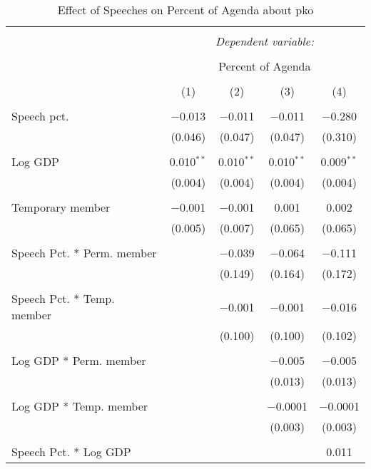 
\begin{table}[!htbp] \centering 
  \caption{Effect of Speeches on Percent of Agenda about  pko} 
  \label{} 
\begin{tabular}{@{\extracolsep{5pt}}lcccc} 
\\[-1.8ex]\hline 
\hline \\[-1.8ex] 
 & \multicolumn{4}{c}{\textit{Dependent variable:}} \\ 
\cline{2-5} 
\\[-1.8ex] & \multicolumn{4}{c}{Percent of Agenda} \\ 
\\[-1.8ex] & (1) & (2) & (3) & (4)\\ 
\hline \\[-1.8ex] 
 Speech pct. & $-$0.013 & $-$0.011 & $-$0.011 & $-$0.280 \\ 
  & (0.046) & (0.047) & (0.047) & (0.310) \\ 
  & & & & \\ 
 Log GDP & 0.010$^{**}$ & 0.010$^{**}$ & 0.010$^{**}$ & 0.009$^{**}$ \\ 
  & (0.004) & (0.004) & (0.004) & (0.004) \\ 
  & & & & \\ 
 Temporary member & $-$0.001 & $-$0.001 & 0.001 & 0.002 \\ 
  & (0.005) & (0.007) & (0.065) & (0.065) \\ 
  & & & & \\ 
 Speech Pct. * Perm. member &  & $-$0.039 & $-$0.064 & $-$0.111 \\ 
  &  & (0.149) & (0.164) & (0.172) \\ 
  & & & & \\ 
 Speech Pct. * Temp. member &  & $-$0.001 & $-$0.001 & $-$0.016 \\ 
  &  & (0.100) & (0.100) & (0.102) \\ 
  & & & & \\ 
 Log GDP * Perm. member &  &  & $-$0.005 & $-$0.005 \\ 
  &  &  & (0.013) & (0.013) \\ 
  & & & & \\ 
 Log GDP * Temp. member &  &  & $-$0.0001 & $-$0.0001 \\ 
  &  &  & (0.003) & (0.003) \\ 
  & & & & \\ 
 Speech Pct. * Log GDP &  &  &  & 0.011 \\ 

\end{tabular}
\end{table}
